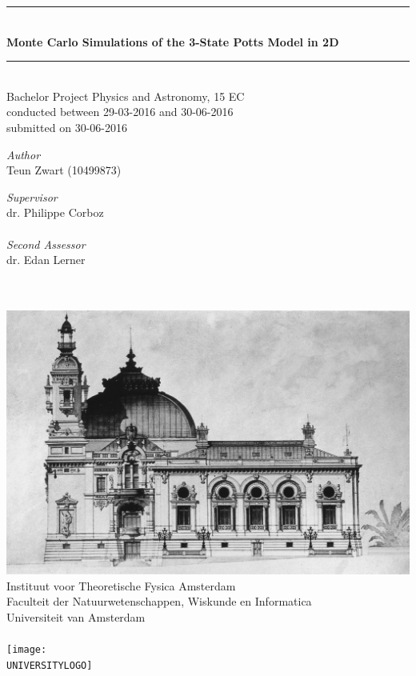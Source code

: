 \documentclass[11pt, a4paper]{report} %
\newcommand\TITLE{Monte Carlo Simulations of the 3-State Potts Model in 2D}
\newcommand\THESISFORM{Bachelor Project Physics and Astronomy, 15 EC\\conducted between 29-03-2016 and 30-06-2016\\submitted on 30-06-2016}
\newcommand\INSTITUTE{Instituut voor Theoretische Fysica Amsterdam}
\newcommand\FACULTY{Faculteit der Natuurwetenschappen, Wiskunde en Informatica}
\newcommand\UNIVERSITY{Universiteit van Amsterdam}
\newcommand\AUTHOR{Teun Zwart (10499873)}
\newcommand\SUPERVISOR{dr. Philippe Corboz}
\newcommand\SECONDASSESSOR{dr. Edan Lerner}
\newcommand\UNIVERSITYLOGO{UvA-logo.png} %
\begin{document}
\begin{titlepage}
	\begin{center}
		\rule{\textwidth}{0.4mm}\\[0.5cm]
		\huge{\textbf{\TITLE}}
		\rule{\textwidth}{0.4mm}\\[0.5cm]
		\large{\THESISFORM}\\[0.5cm]
		\begin{minipage}[t]{0.4\textwidth}
			\begin{flushleft}
				\large\emph{Author}\\{\AUTHOR}
			\end{flushleft}
		\end{minipage}
		\begin{minipage}[t]{0.4\textwidth}
			\begin{flushright}
				\large\emph{Supervisor}\\{\SUPERVISOR}\\~\\
				\large\emph{Second Assessor}\\{\SECONDASSESSOR}\\~\\~\\
			\end{flushright}
		\end{minipage}
		\includegraphics[width=\textwidth]{monte_carlo_casino.jpg}
		\vfill
		\large{\INSTITUTE}\\
		\large{\FACULTY}\\
		\large{\UNIVERSITY}\\~\\
		\texttt{[image: \\UNIVERSITYLOGO]}
	\end{center}
\end{titlepage}
\end{document}
